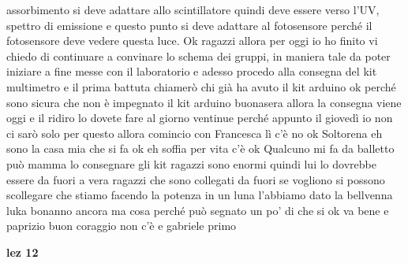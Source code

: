 {assorbimento si deve adattare allo scintillatore quindi deve essere verso l'UV, spettro di emissione e questo punto si deve adattare al fotosensore perché il fotosensore deve vedere questa luce. Ok ragazzi allora per oggi io ho finito vi chiedo di continuare a convinare lo schema dei gruppi, in maniera tale da poter iniziare a fine messe con il laboratorio e adesso procedo alla consegna del kit multimetro e il prima battuta chiamerò chi già ha avuto il kit arduino ok perché sono sicura che non è impegnato il kit arduino buonasera allora la consegna viene oggi e il ridiro lo dovete fare al giorno ventinue perché appunto il giovedì io non ci sarò solo per questo allora comincio con Francesca lì c'è no ok Soltorena eh sono la casa mia che si fa ok eh soffia per vita c'è ok Qualcuno mi fa da balletto può mamma lo consegnare gli kit ragazzi sono enormi quindi lui lo dovrebbe essere da fuori a vera ragazzi che sono collegati da fuori se vogliono si possono scollegare che stiamo facendo la potenza in un luna l'abbiamo dato la bellvenna luka bonanno ancora ma cosa perché può segnato un po' di che si ok va bene e paprizio buon coraggio non c'è e gabriele primo


\textbf{lez 12}

}
